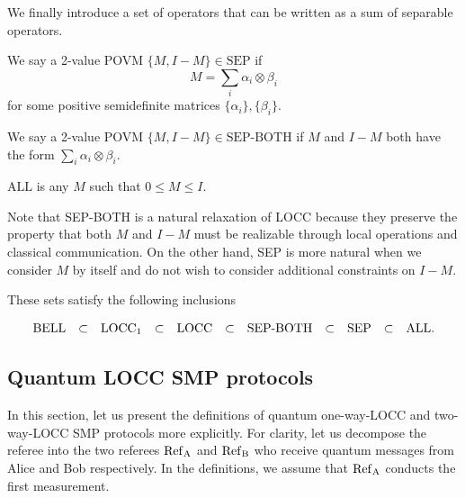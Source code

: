 We finally introduce a set of operators that can be written as a sum of separable operators.

\begin{definition}
     We say a 2-value POVM $\{M, I-M\} \in \mathrm{SEP}$ if
    \begin{equation*}
        M = \sum_i \alpha_i \otimes \beta_i
    \end{equation*}
    for some positive semidefinite matrices $\{\alpha_i\},\{\beta_i\}$.
\end{definition}

\begin{definition}
    We say a 2-value POVM $\{M, I-M\} \in \mathrm{SEP\text{-}BOTH}$ if $M$ and $I-M$ both have the form $\sum_i\alpha_i\otimes\beta_i$.
\end{definition}

\begin{definition}
    $\mathrm{ALL}$ is any $M$ such that $0 \leq M \leq I$.
\end{definition}

Note that SEP-BOTH is a natural relaxation of LOCC
because they preserve the property that both $M$ and $I-M$ must be
realizable through local operations and classical communication.  On
the other hand, SEP is more natural when we consider $M$ by
itself and do not wish to consider additional constraints on $I-M$.

These sets satisfy the following inclusions

$$
\begin{array}{ccccccccccc}
{\rm BELL} &\subset& {\rm LOCC}_1 &\subset& {\rm LOCC}& \subset &
\text{SEP-BOTH} & \subset & {\rm SEP} & \subset & {\rm ALL}.
\end{array}
$$

\subsection{Quantum LOCC SMP protocols}

In this section, let us present the definitions of quantum one-way-LOCC and two-way-LOCC SMP protocols more explicitly. For clarity, let us decompose the referee into the two referees $\rm{Ref}_A$ and $\rm{Ref}_B$ who receive quantum messages from Alice and Bob respectively. In the definitions, we assume that $\rm{Ref}_A$ conducts the first measurement.

